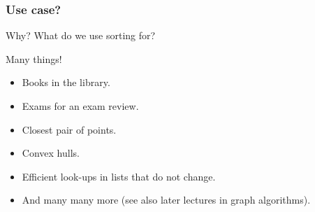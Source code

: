 \begin{frame}
	\frametitle{Use case?}
	\begin{questionblock}{Why?}
		What do we use sorting for?
	\end{questionblock}
	\pause
	\begin{answerblock}{Many things!}
		\begin{itemize}
			\item Books in the library.
			\item Exams for an exam review.
			\item Closest pair of points.
			\item Convex hulls.
			\item Efficient look-ups in lists that do not change.
			\item And many many more (see also later lectures in graph algorithms).
		\end{itemize}	
	\end{answerblock}
\end{frame}
